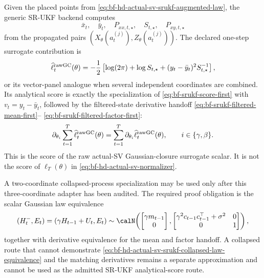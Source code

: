 Given the placed points from
\eqref{eq:bf-hd-actual-sv-srukf-augmented-law}, the generic SR-UKF backend
computes
\[
  \bar x_t,\quad \bar y_t,\quad
  P_{xx,t,\star},\quad S_{t,\star},\quad P_{xy,t,\star}
\]
from the propagated pairs
\((X_\theta(a_t^{(j)}),Z_\theta(a_t^{(j)}))\).  The declared one-step
surrogate contribution is
\begin{equation}
  \widehat\ell_t^{\rm rawGC}(\theta)
  =
  -\frac12
  \left[
    \log(2\pi)+\log S_{t,\star}
    +(y_t-\bar y_t)^2S_{t,\star}^{-1}
  \right],
  \label{eq:bf-hd-actual-sv-srukf-surrogate-loglik}
\end{equation}
or its vector-panel analogue when several independent coordinates are combined.
Its analytical score is exactly the specialization of
\eqref{eq:bf-srukf-score-first} with \(v_t=y_t-\bar y_t\), followed by the
filtered-state derivative handoff
\eqref{eq:bf-srukf-filtered-mean-first}--
\eqref{eq:bf-srukf-filtered-factor-first}:
\begin{equation}
  \partial_{\theta_i}
  \sum_{t=1}^T\widehat\ell_t^{\rm rawGC}(\theta)
  =
  \sum_{t=1}^T
  \partial_{\theta_i}
  \widehat\ell_t^{\rm rawGC}(\theta),
  \qquad i\in\{\gamma,\beta\}.
  \label{eq:bf-hd-actual-sv-srukf-score-handoff}
\end{equation}
This is the score of the raw actual-SV Gaussian-closure surrogate scalar.  It
is not the score of \(\ell_T(\theta)\) in
\eqref{eq:bf-hd-actual-sv-normalizer}.

A two-coordinate collapsed-process specialization may be used only after this
three-coordinate adapter has been audited.  The required proof obligation is
the scalar Gaussian law equivalence
\begin{equation}
  (H_t^-,E_t)
  =
  (\gamma H_{t-1}+U_t,E_t)
  \sim
  \calN\!\left(
    \begin{bmatrix}\gamma m_{t-1}\\0\end{bmatrix},
    \begin{bmatrix}
      \gamma^2 c_{t-1}c_{t-1}^\top+\sigma^2 & 0\\
      0 & 1
    \end{bmatrix}
  \right),
  \label{eq:bf-hd-actual-sv-srukf-collapsed-law-equivalence}
\end{equation}
together with derivative equivalence for the mean and factor handoff.  A
collapsed route that cannot demonstrate
\eqref{eq:bf-hd-actual-sv-srukf-collapsed-law-equivalence} and the matching
derivatives remains a separate approximation and cannot be used as the admitted
SR-UKF analytical-score route.


